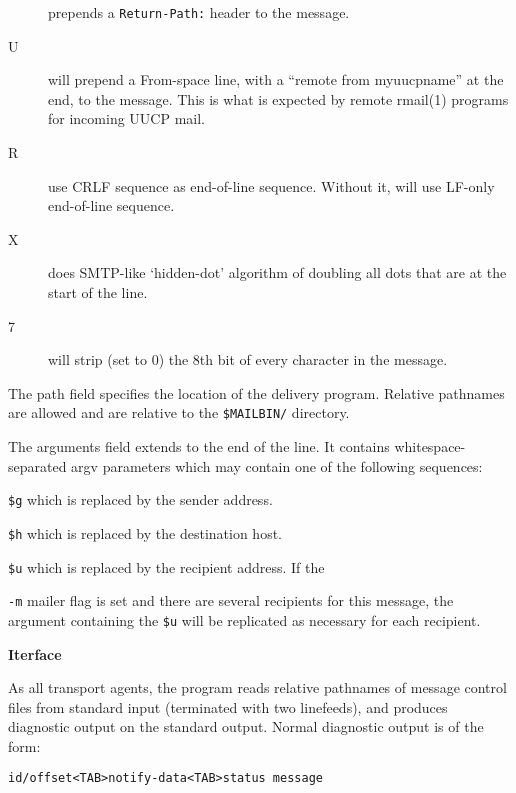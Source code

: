 \begin{description}
prepends a {\tt Return-Path:} header to the message.



\item[U] \mbox{}

will prepend a From-space line, with a ``remote from
myuucpname'' at the end, to the message. This is
what is expected by remote rmail(1) programs for
incoming UUCP mail.



\item[R] \mbox{}

use CRLF sequence as end-of-line sequence. Without it, will use 
LF-only end-of-line sequence.



\item[X] \mbox{}

does SMTP-like `hidden-dot' algorithm of doubling all dots that are 
at the start of the line.



\item[7] \mbox{}

will strip (set to 0) the 8th bit of every character in the message.

\end{description}


The path field specifies the location of the delivery program. 
Relative pathnames are allowed and are relative to
the {\tt \$MAILBIN/} directory.

The arguments field extends to the end of the line. It
contains whitespace-separated argv parameters which may
contain one of the following sequences:

{\tt \$g} which is replaced by the sender address.

{\tt \$h} which is replaced by the destination host.

{\tt \$u} which is replaced by the recipient address. If the

{\tt -m} mailer flag is set and there are several recipients for this message, the argument containing the {\tt \$u} will be replicated as necessary for each recipient.

{\bf Iterface}

As all transport agents, the program reads relative pathnames 
of message control files from standard input (terminated 
with two linefeeds), and produces diagnostic output
on the standard output. Normal diagnostic output is of
the form:

\begin{tscreen}
\begin{verbatim}
id/offset<TAB>notify-data<TAB>status message
\end{verbatim}
\end{tscreen}


